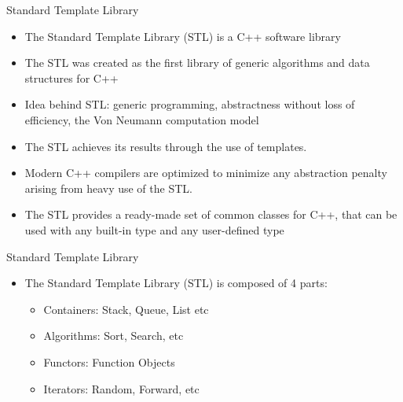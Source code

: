 \documentclass{beamer}
\begin{document}
\begin{frame}[fragile]{Standard Template Library}
  \begin{itemize}
    \item The Standard Template Library (STL) is a C++ software library \pause
    \item The STL was created as the first library of generic algorithms and data structures for C++\pause
    \item Idea behind STL: generic programming, abstractness without loss of efficiency, the Von Neumann computation model\pause
    \item The STL achieves its results through the use of templates.\pause
    \item Modern C++ compilers are optimized to minimize any abstraction penalty arising from heavy use of the STL.\pause
    \item The STL provides a ready-made set of common classes for C++, that can be used with any built-in type and any user-defined type
  \end{itemize}
\end{frame}

\begin{frame}[fragile]{Standard Template Library}
  \begin{itemize}
  \item The Standard Template Library (STL) is composed of 4 parts:\pause
    \begin{itemize}
    \item Containers: Stack, Queue, List etc\pause
    \item Algorithms: Sort, Search, etc\pause
    \item Functors: Function Objects\pause
    \item Iterators: Random, Forward, etc
    \end{itemize}
  \end{itemize}
\end{frame}
\end{document}
